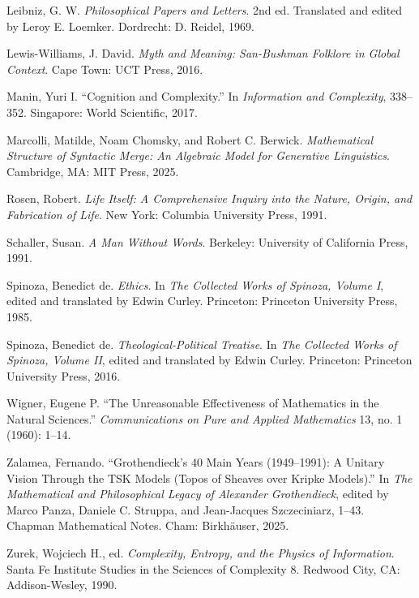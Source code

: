 \documentclass[11pt]{article}
\begin{document}
\begin{description}[leftmargin=0pt,labelwidth=0pt,itemindent=0pt,itemsep=0.55em]
\item Leibniz, G. W. \emph{Philosophical Papers and Letters}. 2nd ed. Translated
and edited by Leroy E. Loemker. Dordrecht: D. Reidel, 1969.

\item Lewis-Williams, J. David. \emph{Myth and Meaning: San-Bushman Folklore in
Global Context}. Cape Town: UCT Press, 2016.

\item Manin, Yuri I. ``Cognition and Complexity.'' In \emph{Information and
Complexity}, 338--352. Singapore: World Scientific, 2017.

\item Marcolli, Matilde, Noam Chomsky, and Robert C. Berwick. \emph{Mathematical
Structure of Syntactic Merge: An Algebraic Model for Generative Linguistics}.
Cambridge, MA: MIT Press, 2025.

\item Rosen, Robert. \emph{Life Itself: A Comprehensive Inquiry into the Nature,
Origin, and Fabrication of Life}. New York: Columbia University Press, 1991.

\item Schaller, Susan. \emph{A Man Without Words}. Berkeley: University of
California Press, 1991.

\item Spinoza, Benedict de. \emph{Ethics}. In \emph{The Collected Works of
Spinoza, Volume I}, edited and translated by Edwin Curley. Princeton: Princeton
University Press, 1985.

\item Spinoza, Benedict de. \emph{Theological-Political Treatise}. In \emph{The
Collected Works of Spinoza, Volume II}, edited and translated by Edwin Curley.
Princeton: Princeton University Press, 2016.

\item Wigner, Eugene P. ``The Unreasonable Effectiveness of Mathematics in the
Natural Sciences.'' \emph{Communications on Pure and Applied Mathematics} 13,
no. 1 (1960): 1--14.

\item Zalamea, Fernando. ``Grothendieck’s 40 Main Years (1949--1991): A Unitary
Vision Through the TSK Models (Topos of Sheaves over Kripke Models).'' In
\emph{The Mathematical and Philosophical Legacy of Alexander Grothendieck},
edited by Marco Panza, Daniele C. Struppa, and Jean-Jacques Szczeciniarz, 1--43.
Chapman Mathematical Notes. Cham: Birkhäuser, 2025.

\item Zurek, Wojciech H., ed. \emph{Complexity, Entropy, and the Physics of
Information}. Santa Fe Institute Studies in the Sciences of Complexity 8.
Redwood City, CA: Addison-Wesley, 1990.
\end{description}
\end{document}
